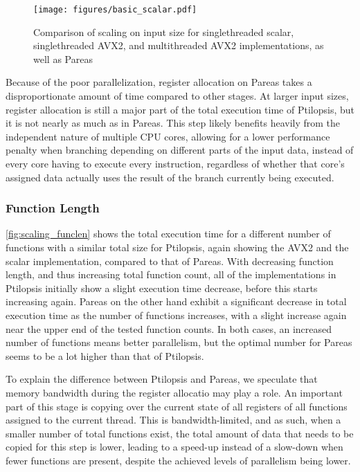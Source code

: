 \documentclass[11pt,dvipsnames]{article}
\begin{document}
\begin{figure}[ht]
    \centering
    \texttt{[image: figures/basic\_scalar.pdf]}
    \caption{Comparison of scaling on input size for singlethreaded scalar, singlethreaded AVX2, and multithreaded AVX2 implementations, as well as Pareas}
    \label{fig:scaling_basic}
\end{figure}

Because of the poor parallelization, register allocation on Pareas takes a disproportionate amount of time compared to other stages. At larger input sizes, register allocation is still a major part of the total execution time of Ptilopsis, but it is not nearly as much as in Pareas. This step likely benefits heavily from the independent nature of multiple CPU cores, allowing for a lower performance penalty when branching depending on different parts of the input data, instead of every core having to execute every instruction, regardless of whether that core's assigned data actually uses the result of the branch currently being executed.

\subsubsection*{Function Length} \label{compare_funclen}

\autoref{fig:scaling_funclen} shows the total execution time for a different number of functions with a similar total size for Ptilopsis, again showing the AVX2 and the scalar implementation, compared to that of Pareas. With decreasing function length, and thus increasing total function count, all of the implementations in Ptilopsis initially show a slight execution time decrease, before this starts increasing again. Pareas on the other hand exhibit a significant decrease in total execution time as the number of functions increases, with a slight increase again near the upper end of the tested function counts. In both cases, an increased number of functions means better parallelism, but the optimal number for Pareas seems to be a lot higher than that of Ptilopsis.

To explain the difference between Ptilopsis and Pareas, we speculate that memory bandwidth during the register allocatio may play a role. An important part of this stage is copying over the current state of all registers of all functions assigned to the current thread. This is bandwidth-limited, and as such, when a smaller number of total functions exist, the total amount of data that needs to be copied for this step is lower, leading to a speed-up instead of a slow-down when fewer functions are present, despite the achieved levels of parallelism being lower.
\end{document}
